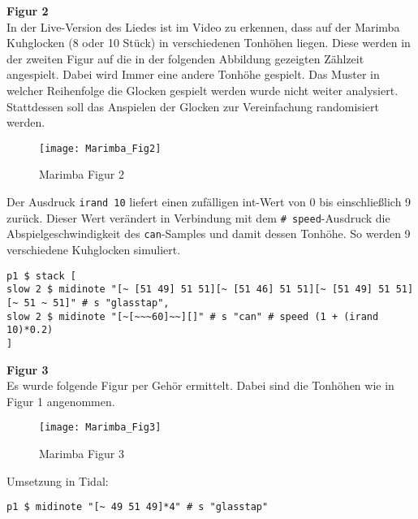 \documentclass[
10pt, %
a4paper, %
oneside, %
headinclude,footinclude, %
BCOR5mm, %
]{scrartcl}
\begin{document}
\noindent \textbf{Figur 2}\\
In der Live-Version des Liedes ist im Video zu erkennen, dass auf der Marimba Kuhglocken (8 oder 10 Stück) in verschiedenen Tonhöhen liegen. Diese werden in der zweiten Figur auf die in der folgenden Abbildung gezeigten Zählzeit angespielt. Dabei wird Immer eine andere Tonhöhe gespielt. Das Muster in welcher Reihenfolge die Glocken gespielt werden wurde nicht weiter analysiert. Stattdessen soll das Anspielen der Glocken zur Vereinfachung randomisiert werden.
\begin{figure}[h]
	\centering 
	\texttt{[image: Marimba\_Fig2]} 
	\caption{Marimba Figur 2}
\end{figure}

\noindent Der Ausdruck \verb|irand 10| \cite{tid7} liefert einen zufälligen int-Wert von 0 bis einschließlich 9 zurück. Dieser Wert verändert in Verbindung mit dem \verb|# speed|-Ausdruck\cite{tid8} die Abspielgeschwindigkeit des \verb|can|-Samples und damit dessen Tonhöhe. So werden 9 verschiedene Kuhglocken simuliert.
\begin{lstlisting}
p1 $ stack [
slow 2 $ midinote "[~ [51 49] 51 51][~ [51 46] 51 51][~ [51 49] 51 51][~ 51 ~ 51]" # s "glasstap",
slow 2 $ midinote "[~[~~~60]~~][]" # s "can" # speed (1 + (irand 10)*0.2)
]
\end{lstlisting}

\noindent \textbf{Figur 3}\\
Es wurde folgende Figur per Gehör ermittelt. Dabei sind die Tonhöhen wie in Figur 1 angenommen.
\begin{figure}[h]
	\centering 
	\texttt{[image: Marimba\_Fig3]} 
	\caption{Marimba Figur 3}
\end{figure}

\noindent Umsetzung in Tidal:
\begin{lstlisting}
p1 $ midinote "[~ 49 51 49]*4" # s "glasstap"
\end{lstlisting}
\end{document}
